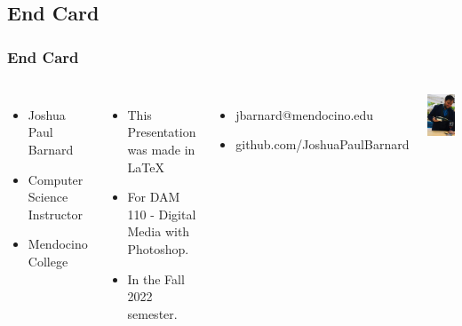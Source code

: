 \documentclass{beamer}
\begin{document}
	\section{}	
		\subsection{End Card}
	\begin{frame}
		\frametitle{End Card}	
		\begin{columns}
			\vspace{-25pt}
			\begin{itemize}
				\item Joshua Paul Barnard
				\item Computer Science Instructor
				\item Mendocino College
			\end{itemize}
			\begin{itemize}
				\item This Presentation was made in \LaTeX
				\item For DAM 110 - Digital Media with Photoshop.
				\item In the Fall 2022 semester.  
			\end{itemize}
			\begin{itemize}
				\item jbarnard@mendocino.edu
				\item github.com/JoshuaPaulBarnard
			\end{itemize}
			\includegraphics[width=.85\textwidth]{images/shone farm wine pouring - vert.png}
		\end{columns}
	\end{frame}
	
\end{document}

